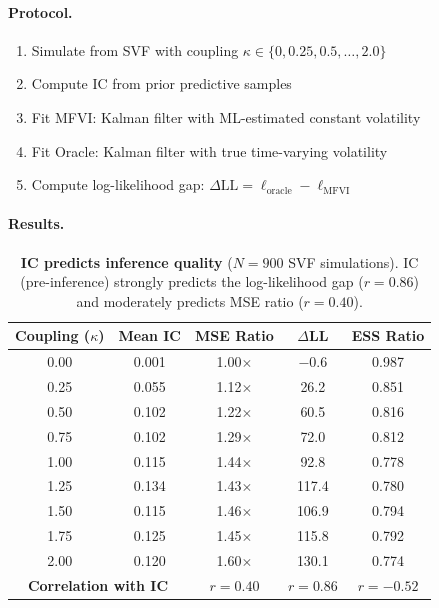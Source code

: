 \documentclass[10pt]{article} %
\theoremstyle{plain}
\theoremstyle{definition}
\begin{document}
\paragraph{Protocol.}
\begin{enumerate}[nosep]
    \item Simulate from SVF with coupling $\kappa \in \{0, 0.25, 0.5, \ldots, 2.0\}$
    \item Compute IC from prior predictive samples
    \item Fit MFVI: Kalman filter with ML-estimated constant volatility
    \item Fit Oracle: Kalman filter with true time-varying volatility
    \item Compute log-likelihood gap: $\Delta\text{LL} = \ell_{\text{oracle}} - \ell_{\text{MFVI}}$
\end{enumerate}

\paragraph{Results.}

\begin{table}[!htbp]
\centering
\caption{\textbf{IC predicts inference quality} ($N = 900$ SVF simulations). IC (pre-inference) strongly predicts the log-likelihood gap ($r = 0.86$) and moderately predicts MSE ratio ($r = 0.40$).}
\label{tab:cf-ll-validation}
\begin{tabular}{ccccc}
\toprule
Coupling ($\kappa$) & Mean IC & MSE Ratio & $\Delta$LL & ESS Ratio \\
\midrule
0.00 & 0.001 & 1.00$\times$ & $-0.6$ & 0.987 \\
0.25 & 0.055 & 1.12$\times$ & 26.2 & 0.851 \\
0.50 & 0.102 & 1.22$\times$ & 60.5 & 0.816 \\
0.75 & 0.102 & 1.29$\times$ & 72.0 & 0.812 \\
1.00 & 0.115 & 1.44$\times$ & 92.8 & 0.778 \\
1.25 & 0.134 & 1.43$\times$ & 117.4 & 0.780 \\
1.50 & 0.115 & 1.46$\times$ & 106.9 & 0.794 \\
1.75 & 0.125 & 1.45$\times$ & 115.8 & 0.792 \\
2.00 & 0.120 & 1.60$\times$ & 130.1 & 0.774 \\
\midrule
\multicolumn{2}{c}{\textbf{Correlation with IC}} & $r = 0.40$ & $r = 0.86$ & $r = -0.52$ \\
\bottomrule
\end{tabular}
\end{table}
\end{document}
